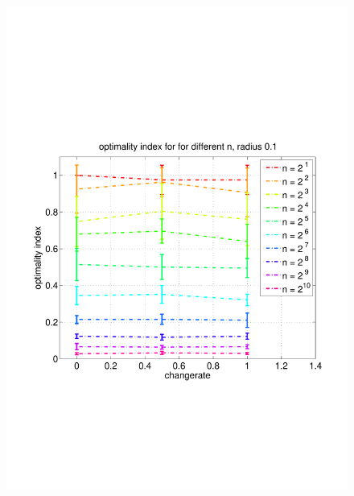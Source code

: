 \documentclass[11pt]{article}
\begin{document}
\begin{figure}
	\includegraphics[width=\linewidth]{../../code/data/2014_12_12_00_55_41/figure_7}
\end{figure}
\end{document}
